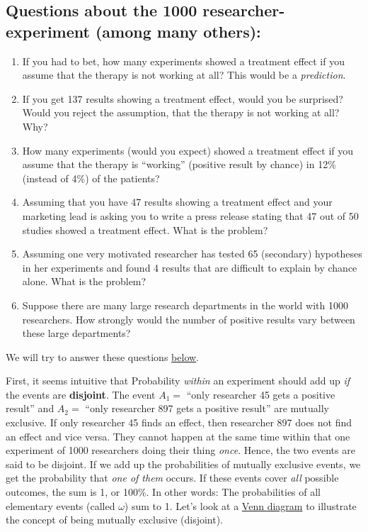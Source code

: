 \documentclass[
]{book}
\providecommand{\tightlist}{%
  \setlength{\itemsep}{0pt}\setlength{\parskip}{0pt}}
\begin{document}
\subsection{Questions about the 1000 researcher-experiment (among many others):}\label{Questions_about_the_1000-researcher_experiment}

\begin{enumerate}
\def\labelenumi{\arabic{enumi}.}
\tightlist
\item
  If you had to bet, how many experiments showed a treatment effect if you assume that the therapy is not
  working at all? This would be a \emph{prediction}.
\item
  If you get 137 results showing a treatment effect, would you be surprised? Would you reject the assumption, that the therapy is not working at all? Why?
\item
  How many experiments (would you expect) showed a treatment effect if you assume that the therapy is ``working'' (positive result by chance) in 12\% (instead of 4\%) of the patients?
\item
  Assuming that you have 47 results showing a treatment effect and your marketing lead is asking you to write a press release stating that 47
  out of 50 studies showed a treatment effect. What is the problem?
\item
  Assuming one very motivated researcher has tested 65 (secondary) hypotheses in her experiments and found 4 results that are difficult to explain by chance alone. What is the problem?
\item
  Suppose there are many large research departments in the world with 1000 researchers. How strongly would the number of positive results vary between these large departments?
\end{enumerate}

We will try to answer these questions \hyperref[Answers_Questions_about_the_1000-researcher_experiment]{below}.

First, it seems intuitive that Probability \emph{within} an experiment should add up \emph{if} the events are \textbf{disjoint}.
The event \(A_1=\) ``only researcher 45 gets a positive result'' and \(A_2=\) ``only researcher 897 gets a positive result'' are mutually exclusive.
If only researcher 45 finds an effect, then researcher 897 does not find an effect and vice versa. They cannot happen at the same time within that one
experiment of 1000 researchers doing their thing \emph{once}. Hence, the two events are said to be disjoint.
If we add up the probabilities of mutually exclusive events, we get the probability that \emph{one of them} occurs. If these events cover \emph{all} possible outcomes, the sum is 1, or 100\%.
In other words: The probabilities of all elementary events (called \(\omega\)) sum to 1. Let's look at a \href{https://en.wikipedia.org/wiki/Venn_diagram}{Venn diagram} to illustrate the concept of being mutually exclusive (disjoint).
\end{document}
